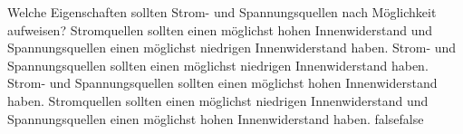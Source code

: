     {Welche Eigenschaften sollten Strom- und Spannungsquellen nach Möglichkeit aufweisen?}
    {Stromquellen sollten einen möglichst hohen Innenwiderstand und Spannungsquellen einen möglichst niedrigen Innenwiderstand haben.}
    {Strom- und Spannungsquellen sollten einen möglichst niedrigen Innenwiderstand haben.}
    {Strom- und Spannungsquellen sollten einen möglichst hohen Innenwiderstand haben.}
    {Stromquellen sollten einen möglichst niedrigen Innenwiderstand und Spannungsquellen einen möglichst hohen Innenwiderstand haben.}
    {false}{false}